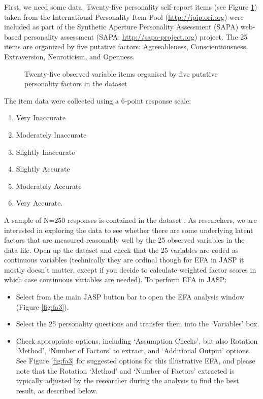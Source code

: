 
First, we need some data. Twenty-five personality self-report items (see Figure \ref{fig:fa2}) taken from the International Personality Item Pool (\url{http://ipip.ori.org}) were included as part of the Synthetic Aperture Personality Assessment (SAPA) web-based personality assessment (SAPA: \url{http://sapa-project.org}) project. The 25 items are organized by five putative factors: Agreeableness, Conscientiousness, Extraversion, Neuroticism, and Openness. 

\begin{figure}[!htb]
\begin{center}
\caption{Twenty-five observed variable items organised by five putative personality factors in the dataset }
\label{fig:fa2}
\HR
\end{center}
\end{figure}

The item data were collected using a 6-point response scale:

\begin{enumerate} \itemsep -2pt
\item Very Inaccurate
\item Moderately Inaccurate
\item Slightly Inaccurate
\item Slightly Accurate
\item Moderately Accurate
\item Very Accurate. 
\end{enumerate}


A sample of N=250 responses is contained in the dataset . As researchers, we are interested in exploring the data to see whether there are some underlying latent factors that are measured reasonably well by the 25 observed variables in the  data file. Open up the dataset and check that the 25 variables are coded as continuous variables (technically they are ordinal though for EFA in JASP it mostly doesn't matter, except if you decide to calculate weighted factor scores in which case continuous variables are needed). To perform EFA in JASP:

\begin{itemize} \itemsep -2pt
\item Select  from the main JASP button bar to open the EFA analysis window (Figure \ref{fig:fa3}).
\item Select the 25 personality questions and transfer them into the ‘Variables’ box.
\item Check appropriate options, including ‘Assumption Checks’, but also Rotation ‘Method’, ‘Number of Factors’ to extract, and ‘Additional Output’ options. See Figure \ref{fig:fa3} for suggested options for this illustrative EFA, and please note that the Rotation ‘Method’ and ‘Number of Factors’ extracted is typically adjusted by the researcher during the analysis to find the best result, as described below.
\end{itemize}

